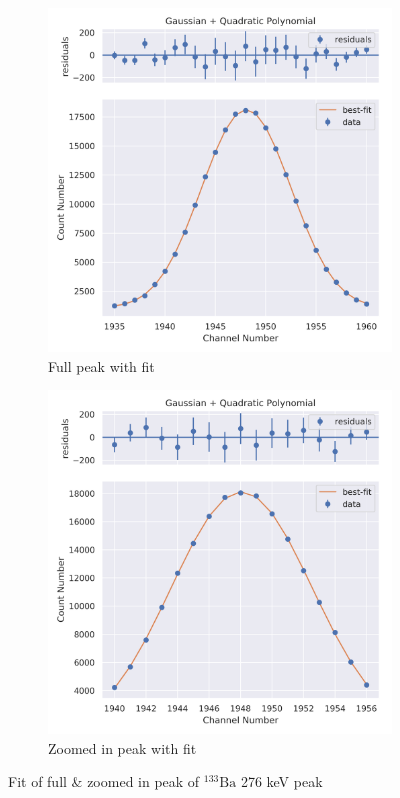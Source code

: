 \documentclass[11pt,a4paper]{article}
\newcommand{\element}[2]{$^{#2}\textrm{#1}$}
\begin{document}
\begin{figure}[H]
  \centering
  \begin{subfigure}{.5\linewidth}
    \centering
    \includegraphics[width=\linewidth]{./Images/Barium133/Quad/Quad_4_Full.png}
    \caption{Full peak with fit}
  \end{subfigure}%
  \begin{subfigure}{.5\linewidth}
    \centering
    \includegraphics[width=\linewidth]{./Images/Barium133/Quad/Quad_4_Zoom.png}
    \caption{Zoomed in peak with fit}
  \end{subfigure}
  \caption{Fit of full \& zoomed in peak of \element{Ba}{133} 276 keV peak}
\end{figure}
\end{document}
